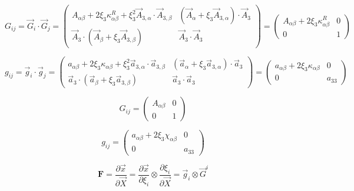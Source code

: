 \documentclass[12pt]{article}
\begin{document}
\begin{equation}
G_{ij} = \vec{G}_i\cdot\vec{G}_j =
\left(\begin{array}{cc}
A_{\alpha\beta} + 2\xi_3\kappa^R_{\alpha\beta}
+ \xi^2_3\vec{A}_{3,\alpha}\cdot\vec{A}_{3,\beta}
 & (\vec{A}_{\alpha} + \xi_3\vec{A}_{3,\alpha})\cdot\vec{A}_3 \\
\vec{A}_3\cdot(\vec{A}_{\beta} + \xi_3\vec{A}_{3,\beta})
 & \vec{A}_3\cdot\vec{A}_3
\end{array}\right)
 = \left(\begin{array}{cc}
A_{\alpha\beta} + 2\xi_3\kappa^R_{\alpha\beta} & 0 \\
 0 & 1
\end{array}\right)
\end{equation}

\begin{equation}
g_{ij} = \vec{g}_i\cdot\vec{g}_j =
\left(\begin{array}{cc}
a_{\alpha\beta} + 2\xi_3\kappa_{\alpha\beta}
+ \xi^2_3\vec{a}_{3,\alpha}\cdot\vec{a}_{3,\beta}
 & (\vec{a}_{\alpha} + \xi_3\vec{a}_{3,\alpha})\cdot\vec{a}_3 \\
\vec{a}_3\cdot(\vec{a}_{\beta} + \xi_3\vec{a}_{3,\beta})
 & \vec{a}_3\cdot\vec{a}_3
\end{array}\right)
 = \left(\begin{array}{cc}
a_{\alpha\beta} + 2\xi_3\kappa_{\alpha\beta} & 0 \\
 0 & a_{33}
\end{array}\right)
\end{equation}

\begin{equation}
G_{ij} = 
\left(\begin{array}{cc}
A_{\alpha\beta} & 0 \\
 0 & 1
\end{array}\right)
\end{equation}

\begin{equation}
g_{ij} = 
\left(\begin{array}{cc}
a_{\alpha\beta} + 2\xi_3\chi_{\alpha\beta} & 0 \\
 0 & a_{33}
\end{array}\right)
\end{equation}

\begin{equation}
\pmb{F} = \frac{\partial\vec{x}}{\partial\vec{X}}
=\frac{\partial\vec{x}}{\partial\xi_i}\otimes\frac{\partial\xi_i}{\partial\vec{X}}
 = \vec{g}_i\otimes\vec{G}^i
\end{equation}
\end{document}
